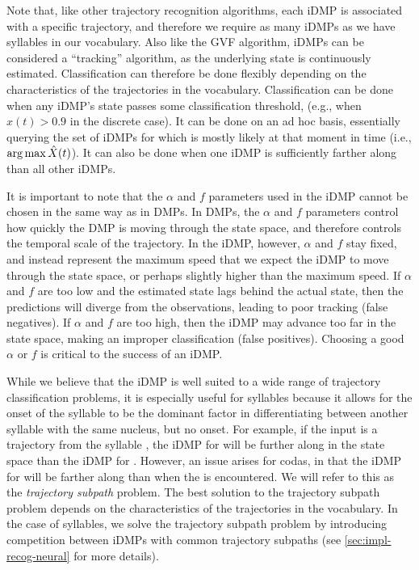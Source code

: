 Note that,
like other trajectory recognition algorithms,
each iDMP is associated with
a specific trajectory,
and therefore we require
as many iDMPs as we have syllables
in our vocabulary.
Also like the GVF algorithm,
iDMPs can be considered a ``tracking'' algorithm,
as the underlying state is continuously estimated.
Classification can therefore be done flexibly
depending on the characteristics
of the trajectories in the vocabulary.
Classification can be done when
any iDMP's state passes some classification threshold,
(e.g., when $\hat{x}(t) > 0.9$ in the discrete case).
It can be done on an ad hoc basis,
essentially querying the set of iDMPs
for which is mostly likely at that moment in time
(i.e., $\operatorname*{arg\,max}{\hat{X}(t)}$).
It can also be done when one iDMP
is sufficiently farther along than
all other iDMPs.

It is important to note that
the $\alpha$ and $f$ parameters
used in the iDMP cannot be chosen
in the same way as in DMPs.
In DMPs,
the $\alpha$ and $f$ parameters
control how quickly
the DMP is moving through
the state space,
and therefore controls
the temporal scale
of the trajectory.
In the iDMP, however,
$\alpha$ and $f$ stay fixed,
and instead represent
the maximum speed that
we expect the iDMP to
move through the state space,
or perhaps slightly higher than
the maximum speed.
If $\alpha$ and $f$ are too low
and the estimated state
lags behind the actual state,
then the predictions will
diverge from the observations,
leading to poor tracking
(false negatives).
If $\alpha$ and $f$ are too high,
then the iDMP may advance
too far in the state space,
making an improper classification
(false positives).
Choosing a good $\alpha$ or $f$
is critical to the success of an iDMP.

While we believe that the iDMP
is well suited to a wide range
of trajectory classification problems,
it is especially useful for syllables
because it allows for
the onset of the syllable to
be the dominant factor
in differentiating between
another syllable with the same nucleus,
but no onset.
For example, if the input is a trajectory
from the syllable \ipa{[bAr]},
the iDMP for \ipa{[bAr]}
will be further along in the state space
than the iDMP for \ipa{[Ar]}.
However, an issue arises
for codas,
in that the iDMP for \ipa{[bA]}
will be farther along than
\ipa{[bAr]} when the \ipa{[r]}
is encountered.
We will refer to this as the
\textit{trajectory subpath} problem.
The best solution to the
trajectory subpath problem depends on
the characteristics of the trajectories
in the vocabulary.
In the case of syllables,
we solve the trajectory subpath problem
by introducing competition
between iDMPs with
common trajectory subpaths
(see \ref{sec:impl-recog-neural} for more details).

